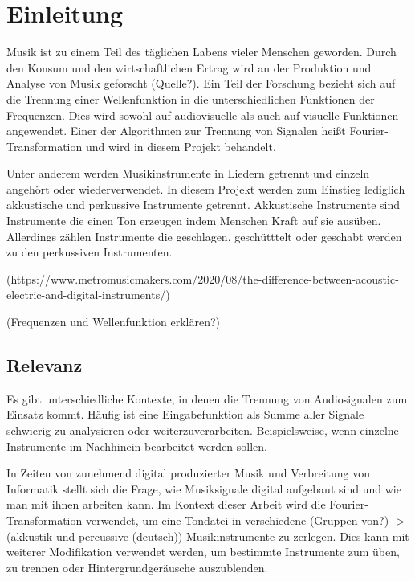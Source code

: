 \chapter{Einleitung}
%

Musik ist zu einem Teil des täglichen Labens vieler Menschen geworden. Durch den Konsum und den wirtschaftlichen Ertrag wird an der Produktion und Analyse von Musik geforscht (Quelle?). Ein Teil der Forschung bezieht sich auf die Trennung einer Wellenfunktion in die unterschiedlichen Funktionen der Frequenzen. Dies wird sowohl auf audiovisuelle als auch auf visuelle Funktionen angewendet. Einer der Algorithmen zur Trennung von Signalen heißt Fourier-Transformation und wird in diesem Projekt behandelt.

\par

Unter anderem werden Musikinstrumente in Liedern getrennt und einzeln angehört oder wiederverwendet. In diesem Projekt werden zum Einstieg lediglich akkustische und perkussive Instrumente getrennt. Akkustische Instrumente sind Instrumente die einen Ton erzeugen indem Menschen Kraft auf sie ausüben. Allerdings zählen Instrumente die geschlagen, geschütttelt oder geschabt werden zu den perkussiven Instrumenten.

(https://www.metromusicmakers.com/2020/08/the-difference-between-acoustic-electric-and-digital-instruments/)

%
(Frequenzen und Wellenfunktion erklären?)
%

%
\section{Relevanz}
%

Es gibt unterschiedliche Kontexte, in denen die Trennung von Audiosignalen zum Einsatz kommt. Häufig ist eine Eingabefunktion als Summe aller Signale schwierig zu analysieren oder weiterzuverarbeiten. Beispielsweise, wenn einzelne Instrumente im Nachhinein bearbeitet werden sollen.

\par

In Zeiten von zunehmend digital produzierter Musik und Verbreitung von Informatik stellt sich die Frage, wie Musiksignale digital aufgebaut sind und wie man mit ihnen arbeiten kann. Im Kontext dieser Arbeit wird die Fourier-Transformation verwendet, um eine Tondatei in verschiedene (Gruppen von?) -> (akkustik und percussive (deutsch)) Musikinstrumente zu zerlegen. Dies kann mit weiterer Modifikation verwendet werden, um bestimmte Instrumente zum üben, zu trennen oder Hintergrundgeräusche auszublenden.

